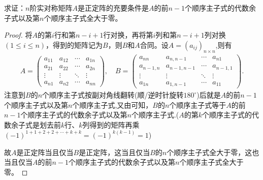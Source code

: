 \documentclass[../../main.tex]{subfiles}%
\begin{document}
\begin{proposition}
求证：\(n\)阶实对称矩阵\(A\)是正定阵的充要条件是\(A\)的前\(n - 1\)个顺序主子式的代数余子式以及第\(n\)个顺序主子式全大于零。
\end{proposition}
\begin{proof}

将\(A\)的第\(i\)行和第\(n - i + 1\)行对换，再将第\(i\)列和第\(n - i + 1\)列对换\((1\leqslant  i\leqslant  n)\)，得到的矩阵记为\(B\)，则\(B\)和\(A\)合同。设$A=(a_{ij})_{n\times n}$,则有
\begin{align*}
A=
\begin{pmatrix}
a_{11} & a_{12} & \cdots & a_{1n} \\
a_{21} & a_{22} & \cdots & a_{2n} \\
\vdots & \vdots & \ddots & \vdots \\
a_{n1} & a_{n2} & \cdots & a_{nn}
\end{pmatrix},\quad
B=
\begin{pmatrix}
a_{nn} & a_{n,n-1} & \cdots & a_{n1} \\
a_{n-1,n} & a_{n-1,n-1} & \cdots & a_{n-1,1} \\
\vdots & \vdots & \ddots & \vdots \\
a_{1n} & a_{1,n-1} & \cdots & a_{11}
\end{pmatrix}.
\end{align*}
注意到\(B\)的\(n\)个顺序主子式按副对角线翻转(顺/逆时针旋转$180^{\circ}$)后就是\(A\)的前\(n - 1\)个顺序主子式以及第\(n\)个顺序主子式,又由可知，\(B\)的\(n\)个顺序主子式等于\(A\)的前\(n - 1\)个顺序主子式的代数余子式以及第\(n\)个顺序主子式.($A$的第$k$个顺序主子式的代数余子式是划去前$k$行、$k$列得到的矩阵再乘$(-1)^{1+1+2+2+\cdots+k+k}=(-1)^{k(k-1)}=1$)

故\(A\)是正定阵当且仅当\(B\)是正定阵，这当且仅当\(B\)的\(n\)个顺序主子式全大于零，这也当且仅当\(A\)的前\(n - 1\)个顺序主子式的代数余子式以及第\(n\)个顺序主子式全大于零。

\end{proof}
\end{document}
